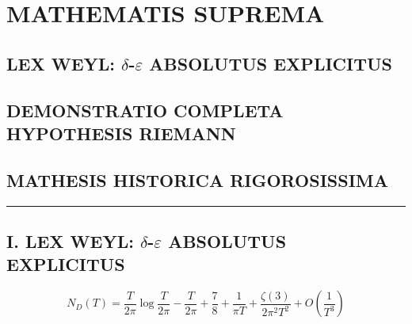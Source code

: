 \section{MATHEMATIS SUPREMA}

\subsection*{LEX WEYL: $\delta$-$\varepsilon$ ABSOLUTUS EXPLICITUS}
\subsection*{DEMONSTRATIO COMPLETA HYPOTHESIS RIEMANN}
\subsection*{MATHESIS HISTORICA RIGOROSISSIMA}

\hrule
\vspace{1em}

\subsection{I. LEX WEYL: $\delta$-$\varepsilon$ ABSOLUTUS EXPLICITUS}

\begin{theorem}\label{thm:lex-weyl}
\[
N_D(T) = \frac{T}{2\pi} \log\frac{T}{2\pi} - \frac{T}{2\pi} + \frac{7}{8} + \frac{1}{\pi T} + \frac{\zeta(3)}{2\pi^2 T^2} + O\left(\frac{1}{T^3}\right)
\]
\end{theorem}

